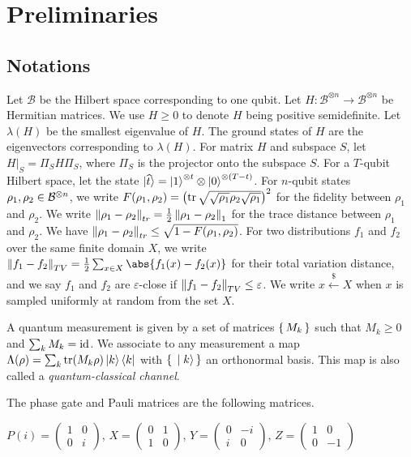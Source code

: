 \section{Preliminaries}


\subsection{Notations}

Let $\mathcal{B}$ be the Hilbert space corresponding to one qubit. Let $H:\mathcal{B}^{\otimes n}\rightarrow\mathcal{B}^{\otimes n}$ be Hermitian matrices. We use $H\geq0$ to denote $H$ being positive semidefinite. Let $\lambda(H)$ be the smallest eigenvalue of $H$. The ground states of $H$ are the eigenvectors corresponding to $\lambda(H)$. For matrix $H$ and subspace $S$, let $H\big|_S=\Pi_S H \Pi_S$, where $\Pi_S$ is the projector onto the subspace $S$. For a $T$-qubit Hilbert space, let the state $\ket{\widehat{t}}=\ket{1}^{\otimes t}\otimes \ket{0}^{{\otimes (T-t)}}$.
For $n$-qubit states $\rho_1, \rho_2\in\mathcal{B}^{\otimes n}$,
we write $F(\rho_1, \rho_2)=\left(\operatorname{tr}\sqrt{\sqrt{\rho_1}\rho_2\sqrt{\rho_1}}\right)^2$ for the fidelity between $\rho_1$ and $\rho_2$.
We write $\left\lVert\rho_1-\rho_2\right\rVert_{tr}=\frac{1}{2}\left\lVert\rho_1-\rho_2\right\rVert_1$ for the trace distance between $\rho_1$ and $\rho_2$.
We have $\left\lVert\rho_1-\rho_2\right\rVert_{tr}\leq\sqrt{1-F(\rho_1, \rho_2)}$.
For two distributions $f_1$ and $f_2$ over the same finite domain $X$, we write $\norm{f_1-f_2}_{TV}=\frac{1}{2}\sum_{x\in X}\abs{f_1(x)-f_2(x)}$ for their total variation distance,
and we say $f_1$ and $f_2$ are $\varepsilon$-close if $\left\lVert f_1-f_2\right\rVert_{TV}\leq\varepsilon$. 
We write $x\xleftarrow{\$}X$ when $x$ is sampled uniformly at random from the set $X$.

\begin{definition} 
	\label{def:QCChannel}
	A quantum measurement is given by a set of matrices $\set{M_k}$ such that $M_k\geq0$ and $\sum_k M_k=\operatorname{id}$.
	We associate to any measurement a map $\Lambda(\rho)=\sum_k \operatorname{tr}(M_k\rho)\ket{k}\bra{k}$
	with $\set{\ket{k}}$ an orthonormal basis.
	This map is also called a \emph{quantum-classical channel}.
\end{definition}

The phase gate and Pauli matrices are the following matrices.

\begin{definition}
	$P(i)=\begin{pmatrix}1&0\\0&i\end{pmatrix}$,
	$X=\begin{pmatrix}0&1\\1&0\end{pmatrix}$,
	$Y=\begin{pmatrix}0&-i\\i&0\end{pmatrix}$,
	$Z=\begin{pmatrix}1&0\\0&-1\end{pmatrix}$
\end{definition}

